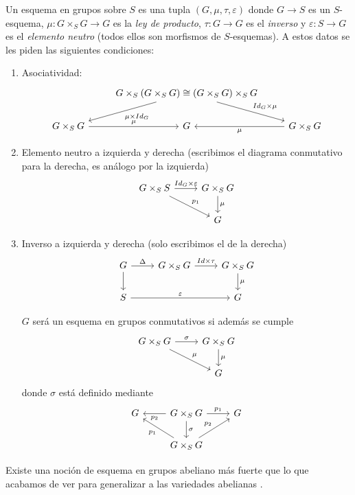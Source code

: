 \documentclass[GA.tex]{subfiles}
\begin{document}
\begin{defi}
Un esquema en grupos sobre $S$ es una tupla $(G,\mu,\tau,\varepsilon)$ donde $G\to S$ es un $S$-esquema, $\mu:G\times_SG\to G$ es la \emph{ley de producto}, $\tau:G\to G$ es el \emph{inverso} y $\varepsilon:S\to G$ es el \emph{elemento neutro} (todos ellos son morfismos de $S$-esquemas). A estos datos se les piden las siguientes condiciones:
\begin{enumerate}
\item Asociatividad:
\[
\begin{tikzcd}
& G\times_S(G\times_S G)\cong (G\times_SG)\times_S G\arrow[rd, "Id_G\times\mu"]\arrow[ld, "\mu\times Id_G"] &\\
G\times_S G \arrow[r, "\mu"] & G & G\times_SG\arrow[l, "\mu"]
\end{tikzcd}
\]
\item Elemento neutro a izquierda y derecha (escribimos el diagrama conmutativo para la derecha, es análogo por la izquierda)
\[
\begin{tikzcd}
G\times_S S \arrow[r, "Id_G\times\varepsilon"]\arrow[dr, "p_1"] & G\times_S G\arrow[d, "\mu"]\\
& G
\end{tikzcd}
\]
\item Inverso a izquierda y derecha (solo escribimos el de la derecha) 
\[
\begin{tikzcd}
G\arrow[r, "\Delta"]\arrow[d] & G\times_S G\arrow[r, "Id\times \tau"] & G\times_S G\arrow[d, "\mu"]\\
S\arrow[rr, "\varepsilon"] & & G
\end{tikzcd}
\]

$G$ será un esquema en grupos conmutativos si además se cumple
\[
\begin{tikzcd}
G\times_S G\arrow[r, "\sigma"] \arrow[dr, "\mu"] & G\times_SG\arrow[d, "\mu"]\\
& G
\end{tikzcd}
\]
donde $\sigma$ está definido mediante
\[
\begin{tikzcd}
G & G\times_SG\arrow[l, "p_2"]\arrow[r, "p_1"]\arrow[d, "\sigma"] & G\\
& G\times_S G\arrow[ul, "p_1"]\arrow[ur, "p_2"] & 
\end{tikzcd}
\]
\end{enumerate}

Existe una noción de esquema en grupos abeliano más fuerte que lo que acabamos de ver para generalizar a las variedades abelianas .
\end{defi}
\end{document}

